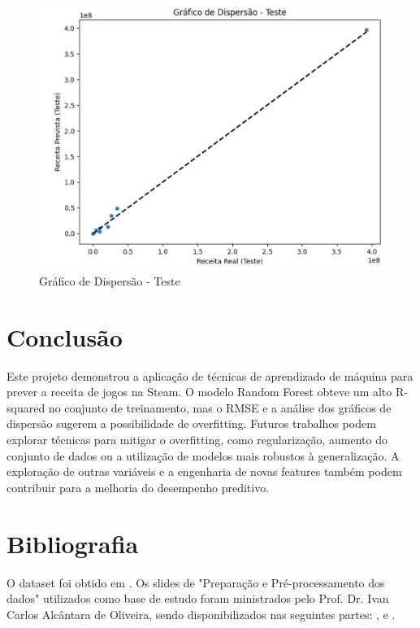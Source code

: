 \documentclass[12pt]{article}
\begin{document}
\begin{figure}
    \centering
    \includegraphics[width=0.5\linewidth]{graficoDispersaoTeste.png}
    \caption{Gráfico de Dispersão - Teste}
    \label{fig:enter-label}
\end{figure}


\section{Conclusão}

Este projeto demonstrou a aplicação de técnicas de aprendizado de máquina para prever a receita de jogos na Steam.  O modelo Random Forest obteve um alto R-squared no conjunto de treinamento, mas o RMSE e a análise dos gráficos de dispersão sugerem a possibilidade de overfitting.  Futuros trabalhos podem explorar técnicas para mitigar o overfitting, como regularização, aumento do conjunto de dados ou a utilização de modelos mais robustos à generalização.  A exploração de outras variáveis e a engenharia de novas features também podem contribuir para a melhoria do desempenho preditivo.

\section{Bibliografia}

O dataset foi obtido em \cite{topcu2024top1500}.
Os slides de "Preparação e Pré-processamento dos dados" utilizados como base de 
estudo foram ministrados pelo Prof. Dr. Ivan Carlos Alcântara de Oliveira, sendo 
disponibilizados nas seguintes partes: 
\cite{professor_slides_2024parte1}, \cite{professor_slides_2024parte2} e 
\cite{professor_slides_2024parte3}.



\end{document}
